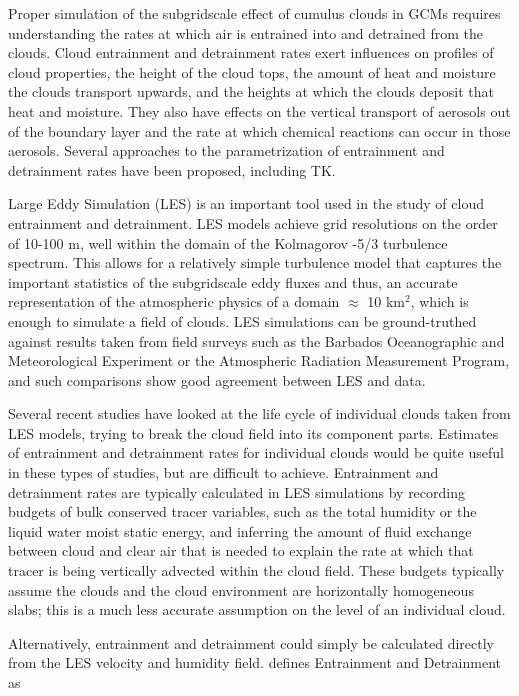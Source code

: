 \documentclass[12pt]{article}
\begin{document}
Proper simulation of the subgridscale effect of cumulus clouds in
GCMs requires understanding the rates at which air is entrained into
and detrained from the clouds. Cloud entrainment and detrainment rates
exert influences on profiles of cloud properties, the height of the
cloud tops, the amount of heat and moisture the clouds transport upwards,
and the heights at which the clouds deposit that heat and moisture.
They also have effects on the vertical transport of aerosols out of
the boundary layer and the rate at which chemical reactions can occur
in those aerosols. Several approaches to the parametrization of entrainment
and detrainment rates have been proposed, including TK.

Large Eddy Simulation (LES) is an important tool used in the study
of cloud entrainment and detrainment. LES models achieve grid resolutions
on the order of 10-100 m, well within the domain of the Kolmagorov -5/3
turbulence spectrum. This allows for a relatively simple turbulence
model that captures the important statistics of the subgridscale eddy
fluxes and thus, an accurate representation of the atmospheric physics
of a domain $\approx$ 10 km$^{2}$, which is enough to simulate a field of clouds. 
LES simulations can be ground-truthed against results taken from field surveys 
such as the Barbados Oceanographic and Meteorological
Experiment \citep[BOMEX;][]{Holland1973} or the Atmospheric Radiation 
Measurement \citep[ARM;][]{Brown2002} Program, and such comparisons 
show good agreement between LES and data.

Several recent studies have looked at the life cycle of individual
clouds taken from LES models, trying to break the cloud field into
its component parts. Estimates of entrainment and detrainment rates
for individual clouds would be quite useful in these types of studies,
but are difficult to achieve. Entrainment and detrainment rates are 
typically calculated in LES simulations by recording budgets
of bulk conserved tracer variables, such as the total humidity or
the liquid water moist static energy, and inferring the amount of
fluid exchange between cloud and clear air that is needed to explain
the rate at which that tracer is being vertically advected within
the cloud field. These budgets typically assume the clouds and the
cloud environment are horizontally homogeneous slabs; this is a much
less accurate assumption on the level of an individual cloud.

Alternatively, entrainment and detrainment could simply be calculated
directly from the LES velocity and humidity field.  \cite{Siebesma1998} 
defines Entrainment and Detrainment as
\end{document}

